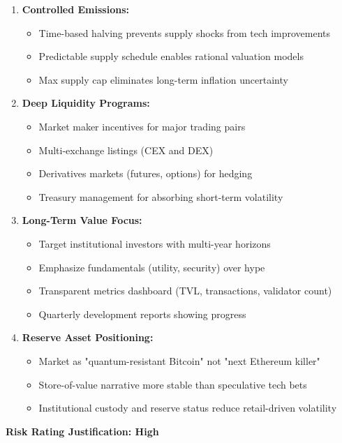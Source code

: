 \documentclass[11pt,a4paper]{article}
\begin{document}
\begin{enumerate}[leftmargin=*]
\item \textbf{Controlled Emissions:}
\begin{itemize}
    \item Time-based halving prevents supply shocks from tech improvements
    \item Predictable supply schedule enables rational valuation models
    \item Max supply cap eliminates long-term inflation uncertainty
\end{itemize}

\item \textbf{Deep Liquidity Programs:}
\begin{itemize}
    \item Market maker incentives for major trading pairs
    \item Multi-exchange listings (CEX and DEX)
    \item Derivatives markets (futures, options) for hedging
    \item Treasury management for absorbing short-term volatility
\end{itemize}

\item \textbf{Long-Term Value Focus:}
\begin{itemize}
    \item Target institutional investors with multi-year horizons
    \item Emphasize fundamentals (utility, security) over hype
    \item Transparent metrics dashboard (TVL, transactions, validator count)
    \item Quarterly development reports showing progress
\end{itemize}

\item \textbf{Reserve Asset Positioning:}
\begin{itemize}
    \item Market as "quantum-resistant Bitcoin" not "next Ethereum killer"
    \item Store-of-value narrative more stable than speculative tech bets
    \item Institutional custody and reserve status reduce retail-driven volatility
\end{itemize}
\end{enumerate}

\textbf{Risk Rating Justification: High}
\end{document}
